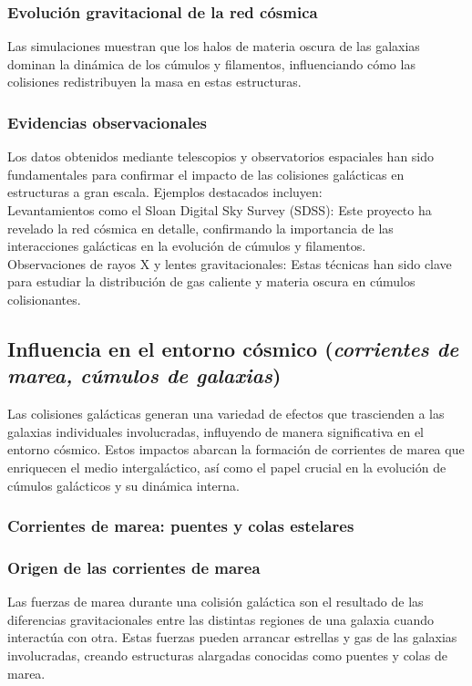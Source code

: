 \documentclass{article}
\begin{document}
\subsubsection*{Evolución gravitacional de la red cósmica}
Las simulaciones muestran que los halos de materia oscura de las galaxias dominan la dinámica de los cúmulos y filamentos, influenciando cómo las colisiones redistribuyen la masa en estas estructuras.
\subsubsection{Evidencias observacionales}
Los datos obtenidos mediante telescopios y observatorios espaciales han sido fundamentales para confirmar el impacto de las colisiones galácticas en estructuras a gran escala. Ejemplos destacados incluyen: \\

Levantamientos como el Sloan Digital Sky Survey (SDSS): Este proyecto ha revelado la red cósmica en detalle, confirmando la importancia de las interacciones galácticas en la evolución de cúmulos y filamentos.\\
Observaciones de rayos X y lentes gravitacionales: Estas técnicas han sido clave para estudiar la distribución de gas caliente y materia oscura en cúmulos colisionantes.

\subsection{Influencia en el entorno cósmico (\textit{corrientes de marea, cúmulos de galaxias})}
Las colisiones galácticas generan una variedad de efectos que trascienden a las galaxias individuales involucradas, influyendo de manera significativa en el entorno cósmico. Estos impactos abarcan la formación de corrientes de marea que enriquecen el medio intergaláctico, así como el papel crucial en la evolución de cúmulos galácticos y su dinámica interna.

\subsubsection{Corrientes de marea: puentes y colas estelares}
\subsubsection*{Origen de las corrientes de marea}
Las fuerzas de marea durante una colisión galáctica son el resultado de las diferencias gravitacionales entre las distintas regiones de una galaxia cuando interactúa con otra. Estas fuerzas pueden arrancar estrellas y gas de las galaxias involucradas, creando estructuras alargadas conocidas como puentes y colas de marea.
\end{document}
